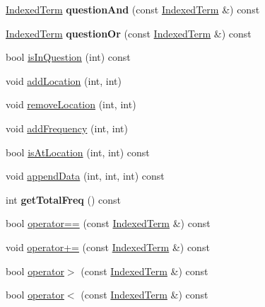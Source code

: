 \begin{DoxyCompactItemize}
\item 
\mbox{\label{classIndexedTerm_a59228c1c0333e71bc7fbed72aae7cfdf}} 
\mbox{\hyperlink{classIndexedTerm}{Indexed\+Term}} {\bfseries question\+And} (const \mbox{\hyperlink{classIndexedTerm}{Indexed\+Term}} \&) const
\item 
\mbox{\label{classIndexedTerm_a94bc68700a69aa4ef5595c42cacb9aa5}} 
\mbox{\hyperlink{classIndexedTerm}{Indexed\+Term}} {\bfseries question\+Or} (const \mbox{\hyperlink{classIndexedTerm}{Indexed\+Term}} \&) const
\item 
bool \mbox{\hyperlink{classIndexedTerm_a1b78549f18a68457fcd438ca33d7ab87}{is\+In\+Question}} (int) const
\item 
void \mbox{\hyperlink{classIndexedTerm_acb1a3eebd31bfa50c78ce0371ec7d444}{add\+Location}} (int, int)
\item 
void \mbox{\hyperlink{classIndexedTerm_ac0b5314a66c032780ffcd9d4f9a1d01b}{remove\+Location}} (int, int)
\item 
void \mbox{\hyperlink{classIndexedTerm_a34d9c26b92764dee339e754264bf6343}{add\+Frequency}} (int, int)
\item 
bool \mbox{\hyperlink{classIndexedTerm_ae39f762b1fce474a50bde0a411d34f70}{is\+At\+Location}} (int, int) const
\item 
void \mbox{\hyperlink{classIndexedTerm_ad5b7b07b86c72b049c30204531b5cf53}{append\+Data}} (int, int, int) const
\item 
\mbox{\label{classIndexedTerm_ad4db70e1ba7defe2c32e00987635d0b3}} 
int {\bfseries get\+Total\+Freq} () const
\item 
bool \mbox{\hyperlink{classIndexedTerm_ae8a7856cb7afd5b7029df2a47bf3c378}{operator==}} (const \mbox{\hyperlink{classIndexedTerm}{Indexed\+Term}} \&) const
\item 
void \mbox{\hyperlink{classIndexedTerm_a826c10c65c29cb7128e485906f884d31}{operator+=}} (const \mbox{\hyperlink{classIndexedTerm}{Indexed\+Term}} \&) const
\item 
bool \mbox{\hyperlink{classIndexedTerm_a770d1caf59facdb5694493aa57123abb}{operator$>$}} (const \mbox{\hyperlink{classIndexedTerm}{Indexed\+Term}} \&) const
\item 
bool \mbox{\hyperlink{classIndexedTerm_aab009480a31b3f9ab1e1d712cf9f8298}{operator$<$}} (const \mbox{\hyperlink{classIndexedTerm}{Indexed\+Term}} \&) const
\end{DoxyCompactItemize}
